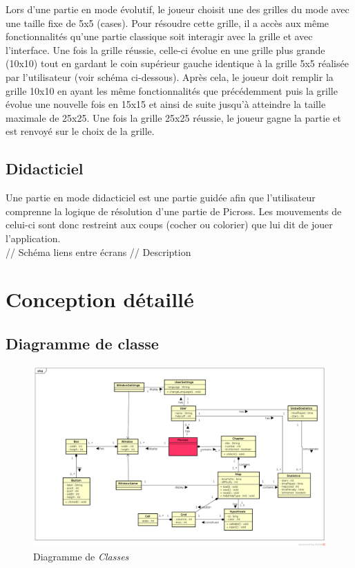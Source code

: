 \documentclass{report}
\begin{document}
	Lors d'une partie en mode évolutif, le joueur choisit une des grilles du mode avec une taille fixe de 5x5 (cases). Pour résoudre cette grille, il a accès aux même fonctionnalités qu'une partie classique soit interagir avec la grille et avec l'interface.
Une fois la grille réussie, celle-ci évolue en une grille plus grande (10x10) tout en gardant le coin supérieur gauche identique à la grille 5x5 réalisée par l'utilisateur (voir schéma ci-dessous). Après cela, le joueur doit remplir la grille 10x10 en ayant les même fonctionnalités que précédemment puis la grille évolue une nouvelle fois en 15x15 et ainsi de suite jusqu'à atteindre la taille maximale de 25x25. Une fois la grille 25x25 réussie, le joueur gagne la partie et est renvoyé sur le choix de la grille.\\
	
	
	\section{Didacticiel}
	
	Une partie en mode didacticiel est une partie guidée afin que l'utilisateur comprenne la logique de résolution d'une partie de Picross. Les mouvements de celui-ci sont donc restreint aux coups (cocher ou colorier) que lui dit de jouer l'application.\\
	
	// Schéma liens entre écrans
	// Description
			
\chapter{Conception détaillé}

    \section{Diagramme de classe}
    
    \begin{figure}[H]
	\caption{Diagramme de \textit{Classes}}
	\includegraphics[width=17cm]{../UML/Class_Diagram/DiagrammeClasse.png}
    \end{figure}
    
\end{document}

